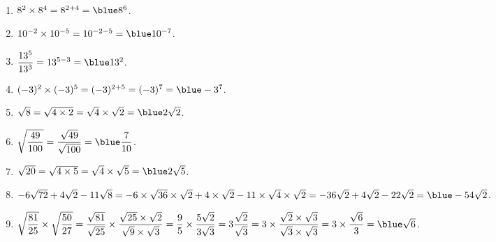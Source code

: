 \ \\ [-5mm]
   \begin{enumerate}
      \item $8^2\times8^4 =8^{2+4} ={\blue 8^6}$.
      \item $10^{-2}\times10^{-5} =10^{-2-5} ={\blue 10^{-7}}$. \smallskip
      \item $\dfrac{13^5}{13^3} =13^{5-3} ={\blue 13^2}$. \smallskip
      \item $(-3)^2\times(-3)^5 =(-3)^{2+5} =(-3)^7 ={\blue -3^7} $.
      \item $\sqrt{8} =\sqrt{4\times2} =\sqrt4\times\sqrt2 ={\blue 2\sqrt2}$. \smallskip
      \item $\sqrt{\dfrac{49}{100}} =\dfrac{\sqrt{49}}{\sqrt{100}} ={\blue \dfrac{7}{10}} $. \smallskip
      \item $\sqrt{20} =\sqrt{4\times5} =\sqrt{4}\times\sqrt{5} ={\blue 2\sqrt5}$.
      \item $-6\sqrt{72} + 4\sqrt{2} - 11 \sqrt{8} =-6\times\sqrt{36}\times\sqrt2 + 4\times\sqrt{2} - 11\times\sqrt4\times\sqrt2 =-36\sqrt2+4\sqrt2-22\sqrt2 = {\blue -54\sqrt2}$. \smallskip
      \item $\sqrt{\dfrac{81}{25}}\times\sqrt{\dfrac{50}{27}} =\dfrac{\sqrt{81}}{\sqrt{25}}\times\dfrac{\sqrt{25}\times\sqrt2}{\sqrt9\times\sqrt3} =\dfrac95\times\dfrac{5\sqrt2}{3\sqrt3} =3\dfrac{\sqrt2}{\sqrt3} =3\times\dfrac{\sqrt2\times\sqrt3}{\sqrt3\times\sqrt3} =3\times\dfrac{\sqrt6}{3} ={\blue \sqrt6}$.
   \end{enumerate}
